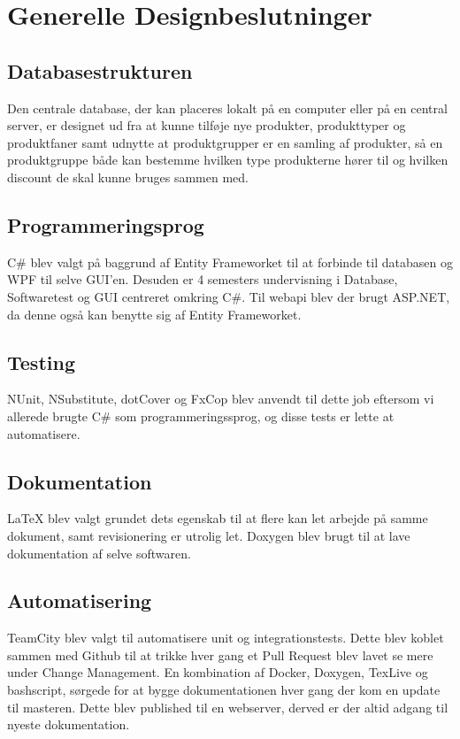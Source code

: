 \section{Generelle Designbeslutninger}

\subsection{Databasestrukturen}
Den centrale database, der kan placeres lokalt på en computer eller på en central server, er designet ud fra at kunne tilføje nye produkter, produkttyper og produktfaner samt udnytte at produktgrupper er en samling af produkter, så en produktgruppe både kan bestemme hvilken type produkterne hører til og hvilken discount de skal kunne bruges sammen med.

\subsection{Programmeringsprog}
C\# blev valgt på baggrund af Entity Frameworket\citep{gh:entityframeworktutorial} til at forbinde til databasen og WPF\cite{gh:WPF} til selve GUI'en. Desuden er 4 semesters undervisning i Database, Softwaretest og GUI centreret omkring C\#. Til webapi\citep{gh:aspnet} blev der brugt ASP.NET, da denne også kan benytte sig af Entity Frameworket.

\subsection{Testing}
NUnit, NSubstitute, dotCover og FxCop blev anvendt til dette job eftersom vi allerede brugte C\# som programmeringssprog, og disse tests er lette at automatisere.

\subsection{Dokumentation}
LaTeX blev valgt grundet dets egenskab til at flere kan let arbejde på samme dokument, samt revisionering er utrolig let. Doxygen blev brugt til at lave dokumentation af selve softwaren.

\subsection{Automatisering}
TeamCity blev valgt til automatisere unit og integrationstests. Dette blev koblet sammen med Github til at trikke hver gang et Pull Request\cite{gh:pullrequests} blev lavet se mere under Change Management.
En kombination af Docker, Doxygen, TexLive og bashscript, sørgede for at bygge dokumentationen hver gang der kom en update til masteren. Dette blev published til en webserver, derved er der altid adgang til nyeste dokumentation.



